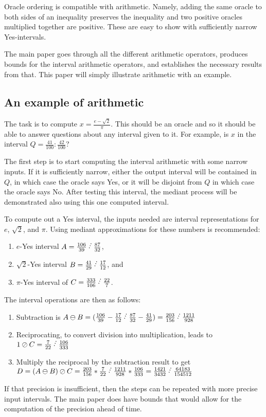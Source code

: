 \documentclass[12pt]{article}
\begin{document}
Oracle ordering is compatible with arithmetic. Namely, adding the same oracle to both sides of an inequality preserves the inequality and two positive oracles multiplied together are positive. These are easy to show with sufficiently narrow Yes-intervals. 

The main paper goes through all the different arithmetic operators, produces bounds for the interval arithmetic operators, and establishes the necessary results from that. This paper will simply illustrate arithmetic with an example. 

\subsection{An example of arithmetic}

The task is to compute $x = \frac{e-\sqrt{2}}{\pi}$. This should be an oracle and so it should be able to answer questions about any interval given to it. For example, is $x$ in the interval $Q = \frac{41}{100}: \frac{42}{100}$? 

The first step is to start computing the interval arithmetic with some narrow inputs. If it is sufficiently narrow, either the output interval will be contained in $Q$, in which case the oracle says Yes, or it will be disjoint from $Q$ in which case the oracle says No. After testing this interval, the mediant process will be demonstrated also using this one computed interval. 

To compute out a Yes interval, the inputs needed are interval representations for $e$, $\sqrt{2}$, and $\pi$. Using mediant approximations for these numbers is recommended: 
\begin{enumerate}
\item $e$-Yes interval $A  = \frac{106}{39} \lte \frac{87}{32}$,
\item $\sqrt{2}$-Yes interval $B = \frac{41}{29} \lte \frac{17}{12}$, and
\item $\pi$-Yes interval of $C= \frac{333}{106} \lte \frac{22}{7}$.
\end{enumerate}
The interval operations are then as follows:
\begin{enumerate}
\item Subtraction is $A\ominus B = (\frac{106}{39} - \frac{17}{12} \lte \frac{87}{32} - \frac{41}{29}) = \frac{203}{156} \lte \frac{1211}{928}$ 
\item Reciprocating, to convert division into multiplication, leads to  $1\oslash C = \frac{7}{22} \lte \frac{106}{333}$
\item Multiply the reciprocal by the subtraction result to get $D = (A\ominus B)\oslash C = \frac{203}{156} *\frac{7}{22} \lte \frac{1211}{928} * \frac{106}{333} = \frac{1421}{3432} \lte \frac{64183}{154512}$
\end{enumerate}
If that precision is insufficient, then the steps can be repeated with more precise input intervals. The main paper does have bounds that would allow for the computation of the precision ahead of time. 
\end{document}
